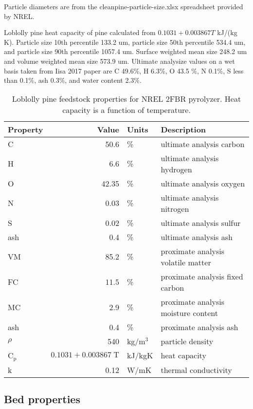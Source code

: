 Particle diameters are from the cleanpine-particle-size.xlsx spreadsheet provided by NREL.

Loblolly pine heat capacity of pine calculated from $0.1031 + 0.003867 T$ kJ/(kg K). Particle size 10th percentile 133.2 um, particle size 50th percentile 534.4 um, and particle size 90th percentile 1057.4 um. Surface weighted mean size 248.2 um and volume weighted mean size 573.9 um. Ultimate analysize values on a wet basis taken from Iisa 2017 paper are C 49.6\%, H 6.3\%, O 43.5 \%, N 0.1\%, S less than 0.1\%, ash 0.3\%, and water content 2.3\%.

\begin{table}[H]
    \centering
    \caption{Loblolly pine feedstock properties for NREL 2FBR pyrolyzer. Heat capacity is a function of temperature.}
    \label{tab:feedstock}
    \begin{tabular}{lrll}
        \toprule
        Property & Value & Units & Description \\
        \midrule
        C & 50.6 & \% & ultimate analysis carbon \\
        H & 6.6 & \% & ultimate analysis hydrogen \\
        O & 42.35 & \% & ultimate analysis oxygen \\
        N & 0.03 & \% & ultimate analysis nitrogen \\
        S & 0.02 & \% & ultimate analysis sulfur \\
        ash & 0.4 & \% & ultimate analysis ash \\
        VM & 85.2 & \% & proximate analysis volatile matter \\
        FC & 11.5 & \% & proximate analysis fixed carbon \\
        MC & 2.9 & \% & proximate analysis moisture content \\
        ash & 0.4 & \% & proximate analysis ash \\
        $\rho$ & 540 & kg/m$^3$ & particle density \\
        C$_\textrm{p}$ & $0.1031 + 0.003867\;\textrm{T}$ & kJ/kgK & heat capacity \\
        k & 0.12 & W/mK & thermal conductivity \\
        \bottomrule
    \end{tabular}
\end{table}

\subsection{Bed properties}

